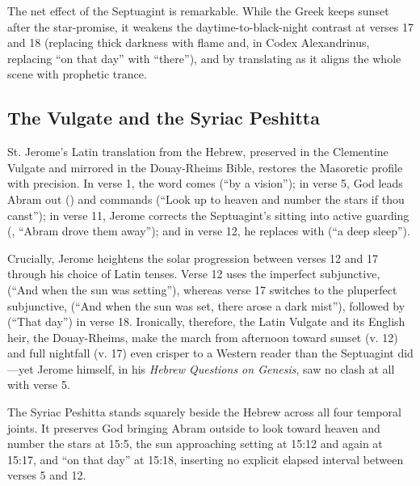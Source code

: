 The net effect of the Septuagint is remarkable. While the Greek keeps sunset after the star-promise, it weakens the daytime-to-black-night contrast at verses 17 and 18 (replacing thick darkness with flame and, in Codex Alexandrinus, replacing ``on that day'' with ``there''), and by translating  as  it aligns the whole scene with prophetic trance.

\subsection{The Vulgate and the Syriac Peshitta}

St. Jerome's Latin translation from the Hebrew, preserved in the Clementine Vulgate and mirrored in the Douay-Rheims Bible, restores the Masoretic profile with precision. In verse 1, the word comes  (``by a vision''); in verse 5, God leads Abram out () and commands  (``Look up to heaven and number the stars if thou canst''); in verse 11, Jerome corrects the Septuagint's sitting into active guarding (, ``Abram drove them away''); and in verse 12, he replaces  with  (``a deep sleep'').

Crucially, Jerome heightens the solar progression between verses 12 and 17 through his choice of Latin tenses. Verse 12 uses the imperfect subjunctive,  (``And when the sun was setting''), whereas verse 17 switches to the pluperfect subjunctive,  (``And when the sun was set, there arose a dark mist''), followed by  (``That day'') in verse 18. Ironically, therefore, the Latin Vulgate and its English heir, the Douay-Rheims, make the march from afternoon toward sunset (v. 12) and full nightfall (v. 17) even crisper to a Western reader than the Septuagint did---yet Jerome himself, in his \emph{Hebrew Questions on Genesis}, saw no clash at all with verse 5.

The Syriac Peshitta stands squarely beside the Hebrew across all four temporal joints. It preserves God bringing Abram outside to look toward heaven and number the stars at 15:5, the sun approaching setting at 15:12 and again at 15:17, and ``on that day'' at 15:18, inserting no explicit elapsed interval between verses 5 and 12.

